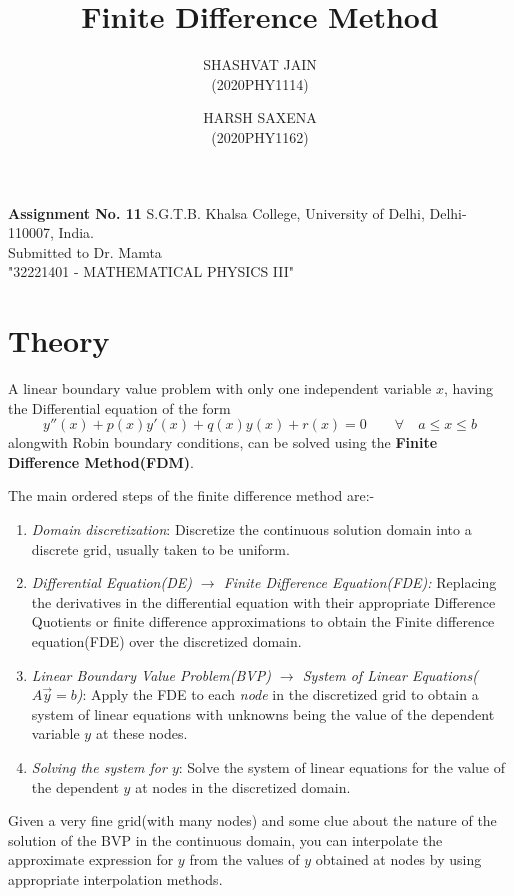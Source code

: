 \documentclass[12pt]{article}
\author{SHASHVAT JAIN\\ (2020PHY1114) \and HARSH SAXENA\\ (2020PHY1162)}
\title{\bf {\color{blue}\textbf{Finite Difference Method}\\} }
\begin{document}
	
	\maketitle
	\begin{center}
		\large{\textbf{Assignment No. 11} }
		\vskip 5cm
		{\color{blue}S.G.T.B. Khalsa College, University of Delhi, Delhi-110007, India.\\} 
		\vfill
		Submitted to Dr. Mamta\\
		"32221401 - MATHEMATICAL PHYSICS III"
	\end{center}
	
	\newpage
	\tableofcontents
	\newpage
	\section{Theory}
	A linear boundary value problem with only one independent variable $ x $, having the Differential equation of the form
	\begin{equation}\label{linear 1D BVP}
		y''(x) + p(x) y'(x) + q(x)y(x) + r(x) = 0 \qquad \forall \quad a\leq x\leq b
 	\end{equation}
 	alongwith Robin boundary conditions, can be solved using the \textbf{Finite Difference Method(FDM)}.
 	
 	The main ordered steps of the finite difference method are:-
 	\begin{enumerate}
 		\item \textit{Domain discretization}:  Discretize the continuous solution domain into a discrete grid, usually taken to be uniform.
 		\item \textit{Differential Equation(DE) $ \rightarrow $ Finite Difference Equation(FDE):} Replacing the derivatives in the differential equation with their appropriate Difference Quotients or finite difference approximations to obtain the Finite difference equation(FDE) over the discretized domain.
 		\item \textit{Linear Boundary Value Problem(BVP) $ \rightarrow $ System of Linear Equations($ A\vec{y} = b $)}: Apply the FDE to each \textit{node} in the discretized grid to obtain a system of linear equations with unknowns being the value of the dependent variable $ y $ at these nodes.
 		\item \textit{Solving the system for $ y $}: Solve the system of linear equations for the value of the dependent $ y $ at nodes in the discretized domain.
 	\end{enumerate}
 	Given a very fine grid(with many nodes) and some clue about the nature of the solution of the BVP in the continuous domain, you can interpolate the approximate expression for $ y $ from the values of $ y $ obtained at nodes by using appropriate interpolation methods.
 	
\end{document}
